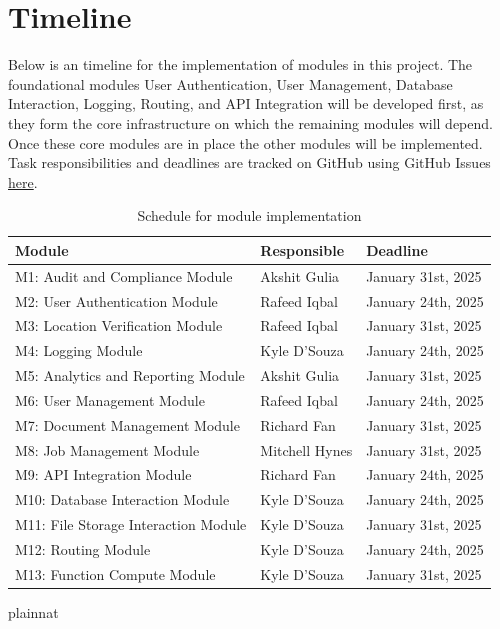 \documentclass[12pt, titlepage]{article}
\begin{document}
\section{Timeline}
Below is an timeline for the implementation of modules in this
project. The foundational modules User Authentication, User
Management, Database Interaction, Logging, Routing, and API
Integration will be developed first, as they form the core
infrastructure on which the remaining modules will depend. Once these
core modules are in place the other modules will be implemented. Task
responsibilities and deadlines are tracked on GitHub using GitHub
Issues \href{https://github.com/Spitgranger/SyncMaster/issues}{here}.
\begin{table}[H]
  \centering
  \begin{tabular}{|l|l|l|}
    \hline
    \textbf{Module} & \textbf{Responsible} & \textbf{Deadline} \\
    \hline
    M1: Audit and Compliance Module  & Akshit Gulia & January 31st, 2025 \\
    \hline
    M2: User Authentication Module    & Rafeed Iqbal & January 24th, 2025 \\
    \hline
    M3: Location Verification Module  & Rafeed Iqbal & January 31st, 2025 \\
    \hline
    M4: Logging Module                & Kyle D'Souza & January 24th, 2025 \\
    \hline
    M5: Analytics and Reporting Module & Akshit Gulia & January 31st, 2025 \\
    \hline
    M6: User Management Module        & Rafeed Iqbal & January 24th, 2025 \\
    \hline
    M7: Document Management Module    & Richard Fan & January 31st, 2025 \\
    \hline
    M8: Job Management Module         & Mitchell Hynes & January 31st, 2025 \\
    \hline
    M9: API Integration Module        & Richard Fan & January 24th, 2025 \\
    \hline
    M10: Database Interaction Module  & Kyle D'Souza & January 24th, 2025 \\
    \hline
    M11: File Storage Interaction Module & Kyle D'Souza & January 31st, 2025 \\
    \hline
    M12: Routing Module               & Kyle D'Souza & January 24th, 2025 \\
    \hline
    M13: Function Compute Module      & Kyle D'Souza & January 31st, 2025 \\
    \hline
  \end{tabular}
  \caption{Schedule for module implementation}
  \label{TblTimeline}
\end{table}

 {plainnat}


\newpage{}
\end{document}
